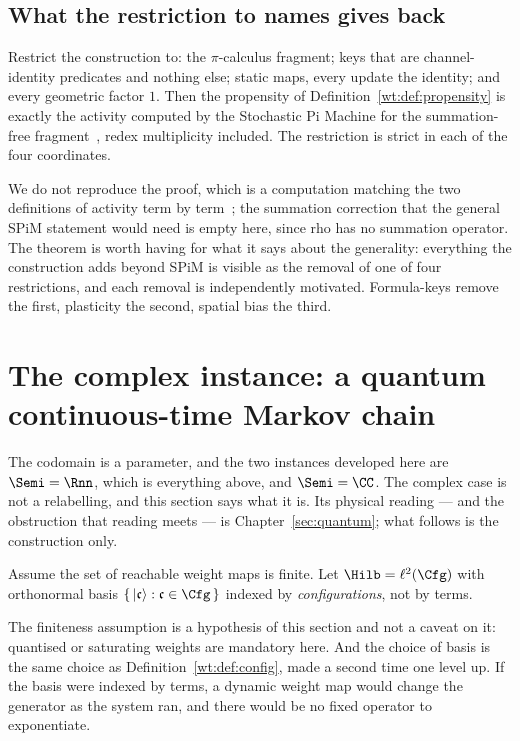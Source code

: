 \subsection{What the restriction to names gives back}

\begin{theorem}
\label{wt:thm:spim}
Restrict the construction to: the $\pi$-calculus fragment; keys that are channel-identity
predicates and nothing else; static maps, every update the identity; and every geometric
factor $1$. Then the propensity of Definition~\ref{wt:def:propensity} is exactly the
activity computed by the Stochastic Pi Machine for the summation-free
fragment~\cite{spim}, redex multiplicity included. The restriction is strict in each of
the four coordinates.
\end{theorem}

We do not reproduce the proof, which is a computation matching the two definitions of
activity term by term~\cite{StochSim}; the summation correction that the general SPiM
statement would need is empty here, since rho has no summation operator. The theorem is
worth having for what it says about the generality: everything the construction adds
beyond SPiM is visible as the removal of one of four restrictions, and each removal is
independently motivated. Formula-keys remove the first, plasticity the second, spatial
bias the third.

\section{The complex instance: a quantum continuous-time Markov chain}
\label{wt:sec:quantum}

The codomain is a parameter, and the two instances developed here are
$\Semi = \Rnn$, which is everything above, and $\Semi = \CC$. The complex case is not a
relabelling, and this section says what it is. Its physical reading --- and the
obstruction that reading meets --- is Chapter~\ref{sec:quantum}; what follows is the
construction only.

\begin{definition}
\label{wt:def:hilbert}
Assume the set of reachable weight maps is finite. Let $\Hilb = \ell^2(\Cfg)$ with
orthonormal basis $\{\,|\mathfrak{c}\rangle : \mathfrak{c} \in \Cfg\,\}$ indexed by
\emph{configurations}, not by terms.
\end{definition}

The finiteness assumption is a hypothesis of this section and not a caveat on it:
quantised or saturating weights are mandatory here. And the choice of basis is the same
choice as Definition~\ref{wt:def:config}, made a second time one level up. If the basis
were indexed by terms, a dynamic weight map would change the generator as the system ran,
and there would be no fixed operator to exponentiate.

